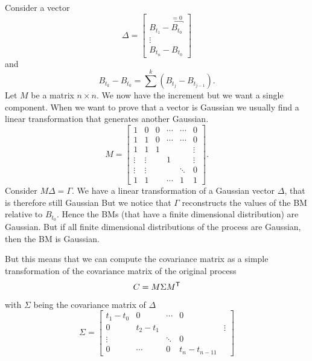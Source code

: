 \documentclass[12pt]{report}
\begin{document}
\begin{fancyproof}
	Consider a vector
	\begin{equation*}
		\Delta=\begin{bmatrix}
			B_{t_{1}}-\overbracket{B_{t_{0}}}^{=0}\\
			\vdots\\
			B_{t_{n}}-B_{t_{0}}
		\end{bmatrix}
	\end{equation*}
	and
	\begin{equation*}
		B_{t_{k}}-B_{t_{0}}=\sum^{k}\left(B_{t_{j}}-B_{t_{j-1}}\right).
	\end{equation*}
	Let $M$ be a matrix $n\times n$. We now have the increment but we want a single component. When we want to prove that a vector is Gaussian we usually find a linear transformation that generates another Gaussian.
	\begin{equation*}
		M=\begin{bmatrix}
			1&0&0&\cdots&\cdots&0\\
			1&1&0&\cdots&\cdots&0\\
			1&1&1&&&\vdots\\
			\vdots&\vdots&&1&&\vdots\\
			\vdots&\vdots&&&\ddots&0\\
			1&1&&\cdots&1&1
		\end{bmatrix}.
	\end{equation*}
	Consider $M\Delta=\Gamma$. We have a linear transformation of a Gaussian vector $\Delta$, that is therefore still Gaussian But we notice that $\Gamma$ reconstructs the values of the BM relative to $B_{t_{0}}$. Hence the BMs (that have a finite dimensional distribution) are Gaussian. But if all finite dimensional distributions of the process are Gaussian, then the BM is Gaussian.
\end{fancyproof}
But this means that we can compute the covariance matrix as a simple transformation of the covariance matrix of the original process
\begin{equation*}
	C=M\Sigma M^{\mathsf{T}}
\end{equation*}
with $\Sigma$ being the covariance matrix of $\Delta$
\begin{equation*}
	\Sigma=\begin{bmatrix}
		t_{1}-t_{0}&0&\cdots&0\\
		0&t_{2}-t_{1}&&&\vdots\\
		\vdots&&\ddots&0\\
		0&\cdots&0&t_{n}-t_{n-11}
	\end{bmatrix}
\end{equation*}
\end{document}
